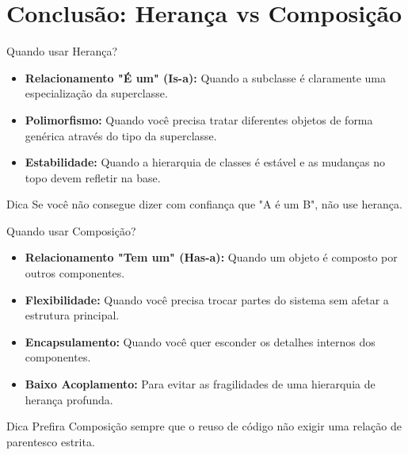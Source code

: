 \documentclass[9pt]{beamer}
\begin{document}
\section{Conclusão: Herança vs Composição}
\begin{frame}{Quando usar Herança?}
    \begin{itemize}
        \item \textbf{Relacionamento "É um" (Is-a):} Quando a subclasse é claramente uma especialização da superclasse.
        \item \textbf{Polimorfismo:} Quando você precisa tratar diferentes objetos de forma genérica através do tipo da superclasse.
        \item \textbf{Estabilidade:} Quando a hierarquia de classes é estável e as mudanças no topo devem refletir na base.
    \end{itemize}
    \begin{exampleblock}{Dica}
        Se você não consegue dizer com confiança que "A é um B", não use herança.
    \end{exampleblock}
\end{frame}

\begin{frame}{Quando usar Composição?}
    \begin{itemize}
        \item \textbf{Relacionamento "Tem um" (Has-a):} Quando um objeto é composto por outros componentes.
        \item \textbf{Flexibilidade:} Quando você precisa trocar partes do sistema sem afetar a estrutura principal.
        \item \textbf{Encapsulamento:} Quando você quer esconder os detalhes internos dos componentes.
        \item \textbf{Baixo Acoplamento:} Para evitar as fragilidades de uma hierarquia de herança profunda.
    \end{itemize}
    \begin{exampleblock}{Dica}
        Prefira Composição sempre que o reuso de código não exigir uma relação de parentesco estrita.
    \end{exampleblock}
\end{frame}
\end{document}

